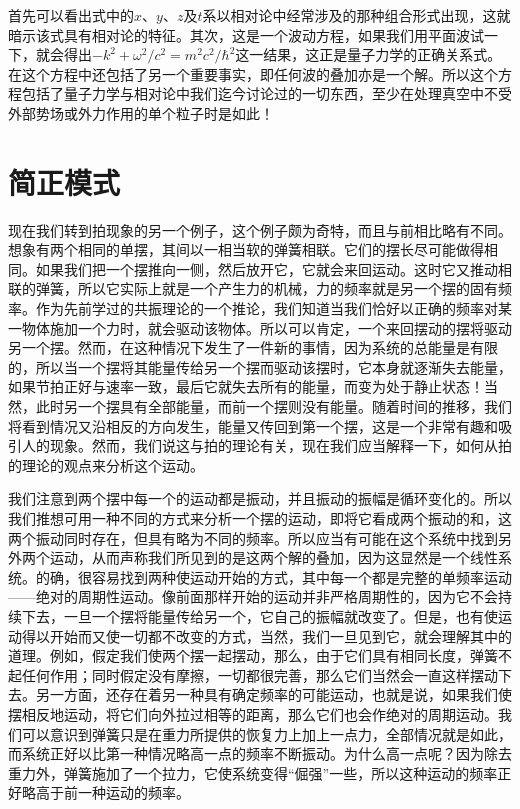 首先可以看出式中的$x$、$y$、$z$及$t$系以相对论中经常涉及的那种组合形式出现，这就暗示该式具有相对论的特征。其次，这是一个波动方程，如果我们用平面波试一下，就会得出$-k^2 + \omega^2/c^2 = m^2c^2/\hbar^2$这一结果，这正是量子力学的正确关系式。在这个方程中还包括了另一个重要事实，即任何波的叠加亦是一个解。所以这个方程包括了量子力学与相对论中我们迄今讨论过的一切东西，至少在处理真空中不受外部势场或外力作用的单个粒子时是如此！

\section{简正模式}

现在我们转到拍现象的另一个例子，这个例子颇为奇特，而且与前相比略有不同。想象有两个相同的单摆，其间以一相当软的弹簧相联。它们的摆长尽可能做得相同。如果我们把一个摆推向一侧，然后放开它，它就会来回运动。这时它又推动相联的弹簧，所以它实际上就是一个产生力的机械，力的频率就是另一个摆的固有频率。作为先前学过的共振理论的一个推论，我们知道当我们恰好以正确的频率对某一物体施加一个力时，就会驱动该物体。所以可以肯定，一个来回摆动的摆将驱动另一个摆。然而，在这种情况下发生了一件新的事情，因为系统的总能量是有限的，所以当一个摆将其能量传给另一个摆而驱动该摆时，它本身就逐渐失去能量，如果节拍正好与速率一致，最后它就失去所有的能量，而变为处于静止状态！当然，此时另一个摆具有全部能量，而前一个摆则没有能量。随着时间的推移，我们将看到情况又沿相反的方向发生，能量又传回到第一个摆，这是一个非常有趣和吸引人的现象。然而，我们说这与拍的理论有关，现在我们应当解释一下，如何从拍的理论的观点来分析这个运动。

我们注意到两个摆中每一个的运动都是振动，并且振动的振幅是循环变化的。所以我们推想可用一种不同的方式来分析一个摆的运动，即将它看成两个振动的和，这两个振动同时存在，但具有略为不同的频率。所以应当有可能在这个系统中找到另外两个运动，从而声称我们所见到的是这两个解的叠加，因为这显然是一个线性系统。的确，很容易找到两种使运动开始的方式，其中每一个都是完整的单频率运动——绝对的周期性运动。像前面那样开始的运动并非严格周期性的，因为它不会持续下去，一旦一个摆将能量传给另一个，它自己的振幅就改变了。但是，也有使运动得以开始而又使一切都不改变的方式，当然，我们一旦见到它，就会理解其中的道理。例如，假定我们使两个摆一起摆动，那么，由于它们具有相同长度，弹簧不起任何作用；同时假定没有摩擦，一切都很完善，那么它们当然会一直这样摆动下去。另一方面，还存在着另一种具有确定频率的可能运动，也就是说，如果我们使摆相反地运动，将它们向外拉过相等的距离，那么它们也会作绝对的周期运动。我们可以意识到弹簧只是在重力所提供的恢复力上加上一点力，全部情况就是如此，而系统正好以比第一种情况略高一点的频率不断振动。为什么高一点呢？因为除去重力外，弹簧施加了一个拉力，它使系统变得“倔强”一些，所以这种运动的频率正好略高于前一种运动的频率。

